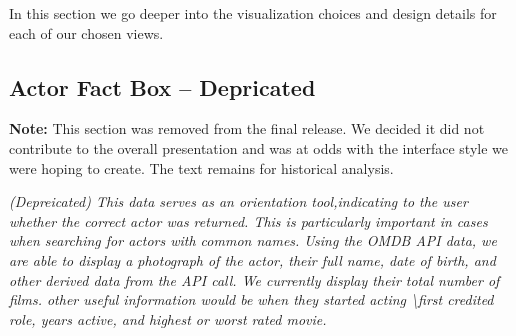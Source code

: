 \documentclass[12pt]{article}
\begin{document}
In this section we go deeper into the visualization choices and design details for each of our chosen views.



\subsection{Actor Fact Box -- Depricated}

\textbf{Note:}  This section was removed from the final release. We decided it did not contribute to the overall presentation and was at odds with the interface style we were hoping to create.  The text remains for  historical analysis.


\textit{ (Depreicated)	This data serves as an orientation tool,indicating to the user whether the correct actor was returned.  This is particularly important in cases when searching for actors with common names.  Using the OMDB API data, we are able to display a photograph of the actor, their full name, date of birth, and other derived data from the API call.  We currently display their total number of films.  other useful information would be when they started acting \textbackslash first credited role, years active, and highest or worst rated movie.}
	
\end{document}
